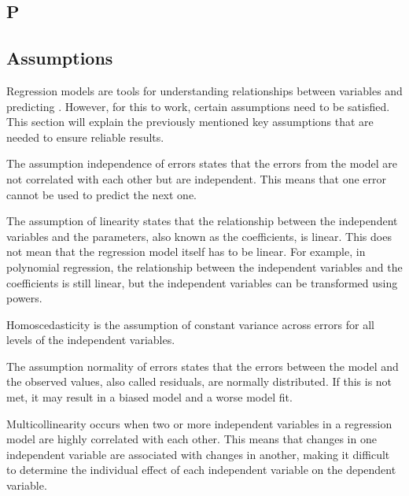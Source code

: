 \subsection{P}



\subsection{Assumptions}

Regression models are tools for understanding relationships between variables and predicting . However, for this to work, certain assumptions need to be satisfied. This section will explain the previously mentioned key assumptions that are needed to ensure reliable results. \newline

\noindent The assumption independence of errors states that the errors from the model are not correlated with each other but are independent. This means that one error cannot be used to predict the next one. \newline


\noindent The assumption of linearity states that the relationship between the independent variables and the parameters, also known as the coefficients, is linear. This does not mean that the regression model itself has to be linear. For example, in polynomial regression, the relationship between the independent variables and the coefficients is still linear, but the independent variables can be transformed using powers.\newline


\noindent Homoscedasticity is the assumption of constant variance across errors for all levels of the independent variables. \newline

\noindent The assumption normality of errors states that the errors between the model and the observed values, also called residuals, are normally distributed. If this is not met, it may result in a biased model and a worse model fit. \newline


\noindent Multicollinearity occurs when two or more independent variables in a regression model are highly correlated with each other. This means that changes in one independent variable are associated with changes in another, making it difficult to determine the individual effect of each independent variable on the dependent variable. \newline

